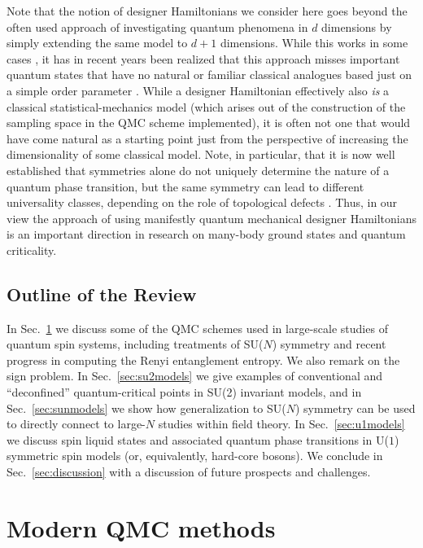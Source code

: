 \documentclass[range]{ar2e}
\begin{document}
Note that the notion of designer Hamiltonians we consider here goes beyond the often used approach of investigating quantum phenomena 
in $d$ dimensions by simply extending the same model to $d+1$ dimensions. While this works in some cases \cite{Rieger94,Sorensen92,Nahum11}, 
it has in recent years been realized that this approach misses important quantum states that have no natural or familiar classical 
analogues based just on a simple order parameter \cite{Senthil04a,Fradkin04,Sachdev08}. While a designer Hamiltonian effectively also {\it is} 
a classical statistical-mechanics model (which arises out of the construction of the sampling space in the QMC scheme implemented), it is 
often not one that would have come natural as a starting point just from the perspective of increasing the dimensionality of some
classical model. Note, in particular, that it is now well established that symmetries alone do not uniquely determine the nature of a 
quantum phase transition, but the same symmetry can lead to different universality classes, depending on the role of topological defects 
\cite{Motrunich04}. Thus, in our view the approach of using manifestly quantum mechanical designer Hamiltonians is an important direction
in research on many-body ground states and quantum criticality.

\subsection{Outline of the Review}

In Sec.~\ref{sec:methods} we discuss some of the QMC schemes used in large-scale studies of quantum spin systems, including treatments
of SU($N$) symmetry and recent progress in computing the Renyi entanglement entropy. We also remark on the sign problem. In 
Sec.~\ref{sec:su2models} we give examples of conventional and ``deconfined'' quantum-critical points in SU(2) invariant models, and in 
Sec.~\ref{sec:sunmodels} we show how generalization to SU($N$) symmetry can be used to directly connect to large-$N$ studies within
field theory. In Sec.~\ref{sec:u1models} we discuss spin liquid states and associated quantum phase transitions in U($1$) symmetric spin
models (or, equivalently, hard-core bosons). We conclude in Sec.~\ref{sec:discussion} with a discussion of future prospects and challenges.

\section{Modern QMC methods}
\label{sec:methods}
\end{document}
